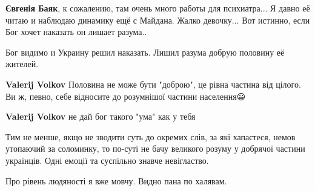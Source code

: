 \begin{itemize}
\begin{itemize}
 
\textbf{Євгенія Баяк}, к сожалению, там очень много работы для психиатра... Я
давно её читаю и наблюдаю динамику ещё с Майдана. Жалко девочку... Вот истинно,
если Бог хочет наказать он лишает разума..

 
Бог видимо и Украину решил наказать.
Лишил разума добрую половину её жителей.

 
\textbf{Valerij Volkov} Половина не може бути "доброю", це рівна частина від цілого. Ви ж, певно, себе відносите до розумнішої частини населення😀

 
\textbf{Valerij Volkov} не дай бог такого "ума" как у тебя 🥴

 

Тим не менше, якщо не зводити суть до окремих слів, за які хапаєтеся, немов
утопаючий за соломинку, то по-суті не бачу великого розуму у добрячої частини
українців. Одні емоції та суспільно знавче невігластво.

Про рівень людяності я вже мовчу. Видно пана по халявам.

 

\end{itemize}
\end{itemize}
